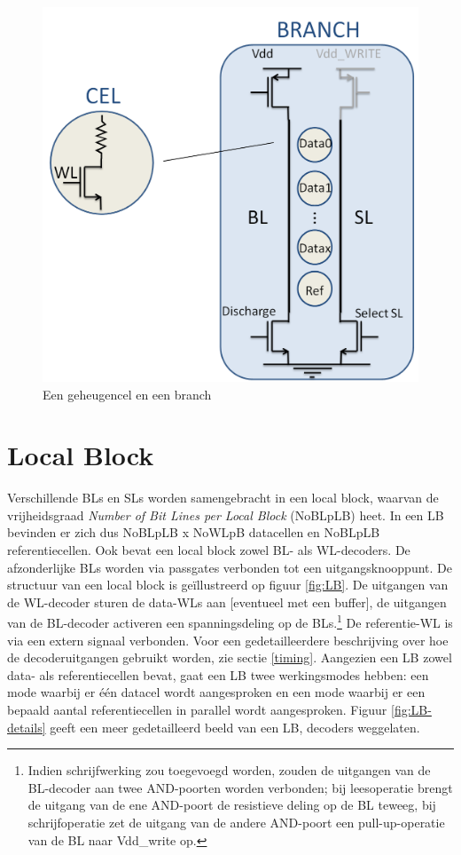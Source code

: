 \begin{figure}
  \centering
  \includegraphics[scale=0.3]{../fig/hfdstk-architecture-cell-branch.png}
  \caption{Een geheugencel en een branch}
  \label{fig:cellbranch}
\end{figure}

\section{Local Block}
Verschillende BLs en SLs worden samengebracht in een local block, waarvan de vrijheidsgraad \emph{Number of Bit Lines per Local Block} (NoBLpLB) heet. In een LB bevinden er zich dus NoBLpLB x NoWLpB datacellen en NoBLpLB referentiecellen. Ook bevat een local block zowel BL- als WL-decoders. De afzonderlijke BLs worden via passgates verbonden tot een uitgangsknooppunt.
De structuur van een local block is geïllustreerd op figuur \ref{fig:LB}.
De uitgangen van de WL-decoder sturen de data-WLs aan [eventueel met een buffer], de uitgangen van de BL-decoder activeren een spanningsdeling op de BLs.\footnote{Indien schrijfwerking zou toegevoegd worden, zouden de uitgangen van de BL-decoder aan twee AND-poorten worden verbonden; bij leesoperatie brengt de uitgang van de ene AND-poort de resistieve deling op de BL teweeg, bij schrijfoperatie zet de uitgang van de andere AND-poort een pull-up-operatie van de BL naar Vdd\_write op.} De referentie-WL is via een extern signaal verbonden. Voor een gedetailleerdere beschrijving over hoe de decoderuitgangen gebruikt worden, zie sectie \ref{timing}.
Aangezien een LB zowel data- als referentiecellen bevat, gaat een LB twee werkingsmodes hebben: een mode waarbij er één datacel wordt aangesproken en een mode waarbij er een bepaald aantal referentiecellen in parallel wordt aangesproken.
Figuur \ref{fig:LB-details} geeft een meer gedetailleerd beeld van een LB, decoders weggelaten.

